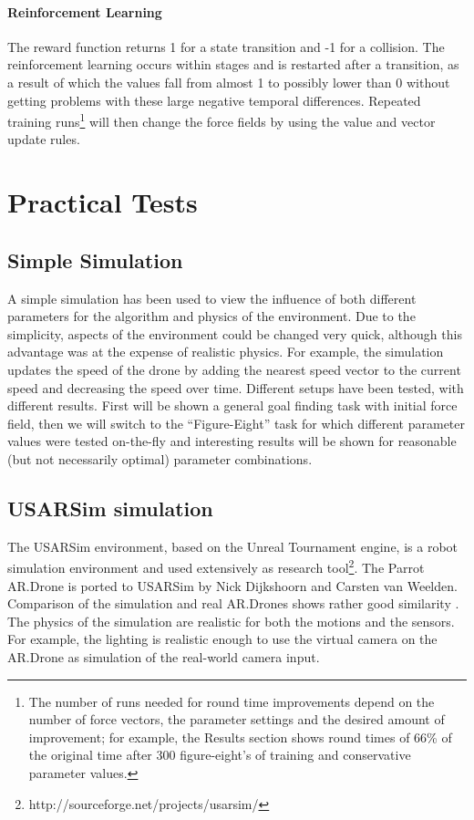 \documentclass[11pt]{article}
\begin{document}
\paragraph{Reinforcement Learning}
The reward function returns 1 for a state transition and -1 for a collision. The reinforcement learning occurs within stages and is restarted after a transition, as a result of which the values fall from almost 1 to possibly lower than 0 without getting problems with these large negative temporal differences. Repeated training runs\footnote{The number of runs needed for round time improvements depend on the number of force vectors, the parameter settings and the desired amount of improvement; for example, the Results section shows round times of 66\% of the original time after 300 figure-eight's of training and conservative parameter values.} will then change the force fields by using the value and vector update rules.



\section{Practical Tests}
\label{sec:tests}

\subsection{Simple Simulation}
A simple simulation has been used to view the influence of both different parameters for the algorithm and physics of the environment. Due to the simplicity, aspects of the environment could be changed very quick, although this advantage was at the expense of realistic physics. For example, the simulation updates the speed of the drone by adding the nearest speed vector to the current speed and decreasing the speed over time. Different setups have been tested, with different results. First will be shown a general goal finding task with initial force field, then we will switch to the ``Figure-Eight'' task for which different parameter values were tested on-the-fly and interesting results will be shown for reasonable (but not necessarily optimal) parameter combinations.

\subsection{USARSim simulation}
The USARSim environment, based on the Unreal Tournament engine, is a robot simulation environment and used extensively as research tool\footnote{http://sourceforge.net/projects/usarsim/}. The Parrot AR.Drone is ported to USARSim by Nick Dijkshoorn and Carsten van Weelden. Comparison of the simulation and real AR.Drones shows rather good similarity \cite{nick}. The physics of the simulation are realistic for both the motions and the sensors. For example, the lighting is realistic enough to use the virtual camera on the AR.Drone as simulation of the real-world camera input.
\end{document}
